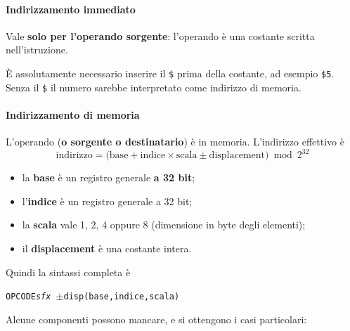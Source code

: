 \documentclass[11pt,a4paper]{article}
\begin{document}
\paragraph*{Indirizzamento immediato}

Vale \textbf{solo per l'operando sorgente}: l'operando è una costante scritta nell'istruzione.

\begin{nota}
È assolutamente necessario inserire il \texttt{\$} prima della costante, ad esempio \texttt{\$5}. Senza il \texttt{\$} il numero sarebbe interpretato come indirizzo di memoria.
\end{nota}

\paragraph*{Indirizzamento di memoria}

L'operando (\textbf{o sorgente o destinatario}) è in memoria. L'indirizzo effettivo è
\[
\text{indirizzo} = \big(\text{base} + \text{indice}\times\text{scala} \pm \text{displacement}\big) \bmod 2^{32}
\]
\begin{itemize}[leftmargin=*]
  \item la \textbf{base} è un registro generale \textbf{a 32 bit};
  \item l'\textbf{indice} è un registro generale a 32 bit;
  \item la \textbf{scala} vale 1, 2, 4 oppure 8 (dimensione in byte degli elementi);
  \item il \textbf{displacement} è una costante intera.
\end{itemize}

Quindi la sintassi completa è
\begin{center}
\texttt{OPCODE\emph{sfx} $\pm$disp(base,indice,scala)}
\end{center}
Alcune componenti possono mancare, e si ottengono i casi particolari:
\end{document}
